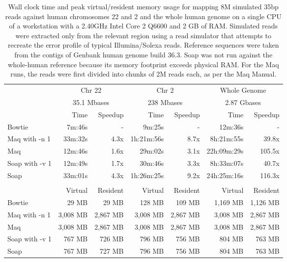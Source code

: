 \documentclass[letterpaper]{article}
\begin{document}
\begin{table}[tp]
\scriptsize
\begin{tabular}{lrrrrrr}
\toprule
 & \multicolumn{2}{c}{Chr 22} & \multicolumn{2}{c}{Chr 2} & \multicolumn{2}{c}{Whole Genome} \\[3pt] 
 & \multicolumn{2}{c}{35.1 Mbases} & \multicolumn{2}{c}{238 Mbases} & \multicolumn{2}{c}{2.87 Gbases} \\[3pt] 
 & Time & Speedup & Time & Speedup & Time & Speedup \\ 
\toprule
Bowtie & 7m:46s & - & 9m:25s & - & 12m:36s & -  \\ \midrule 
Maq with -n 1 & 33m:32s & 4.3x & 1h:21m:56s & 8.7x & 8h:21m:55s & 39.8x  \\ \midrule 
Maq & 12m:46s & 1.6x & 29m:02s & 3.1x & 22h:09m:29s & 105.5x  \\ \midrule 
Soap with -v 1 & 12m:49s & 1.7x & 30m:46s & 3.3x & 8h:33m:07s & 40.7x  \\ \midrule 
Soap & 33m:01s & 4.3x & 1h:26m:25s & 9.2x & 24h:25m:16s & 116.3x  \\[2pt] \bottomrule \\ 
 & Virtual & Resident & Virtual & Resident & Virtual & Resident \\ 
\toprule
Bowtie & 29 MB & 29 MB & 128 MB & 109 MB & 1,169 MB & 1,126 MB  \\ \midrule 
Maq with -n 1 & 3,008 MB & 2,867 MB & 3,008 MB & 2,867 MB & 3,008 MB & 2,867 MB  \\ \midrule 
Maq & 3,008 MB & 2,867 MB & 3,008 MB & 2,867 MB & 3,008 MB & 2,867 MB  \\ \midrule 
Soap with -v 1 & 767 MB & 726 MB & 796 MB & 756 MB & 804 MB & 763 MB  \\ \midrule 
Soap & 767 MB & 727 MB & 796 MB & 756 MB & 804 MB & 763 MB  \\ 
\bottomrule
\end{tabular}
\scriptsize\caption{Wall clock time and peak virtual/resident memory usage for mapping 8M simulated 35bp reads against human chromosomes 22 and 2 and the whole human genome on a single CPU of a workstation with a 2.40GHz Intel Core 2 Q6600 and 2 GB of RAM. Simulated reads were extracted only from the relevant region using a read simulator that attempts to recreate the error profile of typical Illumina/Solexa reads. Reference sequences were taken from the contigs of Genbank human genome build 36.3. Soap was not run against the whole-human reference because its memory footprint exceeds physical RAM. For the Maq runs, the reads were first divided into chunks of 2M reads each, as per the Maq Manual.}
\end{table}
\end{document}
